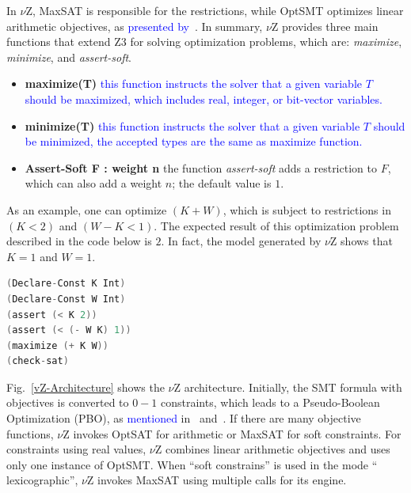 \documentclass{doublecol-new}
\theoremstyle{TH}{
\newtheorem{lemma}{Lemma}
\newtheorem{theorem}[lemma]{Theorem}
\newtheorem{corrolary}[lemma]{Corrolary}
\newtheorem{conjecture}[lemma]{Conjecture}
\newtheorem{proposition}[lemma]{Proposition}
\newtheorem{claim}[lemma]{Claim}
\newtheorem{stheorem}[lemma]{Wrong Theorem}
\newtheorem{algorithm}{Algorithm}
}
\theoremstyle{THrm}{
\newtheorem{definition}{Definition}[section]
\newtheorem{question}{Question}[section]
\newtheorem{remark}{Remark}
\newtheorem{scheme}{Scheme}
}
\theoremstyle{THhit}{
\newtheorem{case}{Case}[section]
}
\begin{document}
In $\nu$Z, MaxSAT is responsible for the restrictions, while OptSMT optimizes linear arithmetic objectives, as \textcolor{blue}{presented by}~\cite{Bjorner2015}. In summary, $\nu$Z provides three main functions that extend Z3 for solving optimization problems, which are: \textit{maximize}, \textit{minimize}, and \textit{assert-soft}.

\begin{itemize}
\item{\textbf{maximize(T)}
\textcolor{blue}{this function instructs the solver that a given variable $T$ should be maximized, which includes real, integer, or bit-vector variables.}}
\item{\textbf{minimize(T)}
\textcolor{blue}{this function instructs the solver that a given variable $T$ should be minimized, the accepted types are the same as maximize function.}}
\item{\textbf{Assert-Soft F : weight n}
the function \textit{assert-soft} adds a restriction to $F$, which can also add a weight $n$; the default value is $1$.}
\end{itemize}

As an example, one can optimize $\left(K + W\right)$, which is subject to restrictions in $\left(K < 2\right)$ and $\left(W - K < 1\right)$. The expected result of this optimization problem described in the code below is $2$. In fact, the model generated by $\nu$Z shows that $K = 1$ and $W = 1$.

\begin{lstlisting}[basicstyle=\footnotesize,language=C,caption={OpenMP basic Example.},label={vZ},numbersep=7pt,frame=tb,captionpos=t,numberstyle=\tiny]
(Declare-Const K Int) 
(Declare-Const W Int)
(assert (< K 2)) 
(assert (< (- W K) 1))
(maximize (+ K W)) 
(check-sat)
\end{lstlisting}

\vspace{2 mm}
Fig.~\ref{vZ-Architecture} shows the $\nu$Z architecture. Initially, the SMT formula with objectives is converted to $0-1$ constraints, which leads to a Pseudo-Boolean Optimization (PBO), as \textcolor{blue}{mentioned} in~\cite{Barth1995} and~\cite{Vasco2005}. If there are many objective functions, $\nu$Z invokes OptSAT for arithmetic or MaxSAT for soft constraints. For constraints using real values, $\nu$Z combines linear arithmetic objectives and uses only one instance of OptSMT. When ``soft constrains'' is used in the mode `` lexicographic'', $\nu$Z invokes MaxSAT using multiple calls for its engine.
\end{document}
